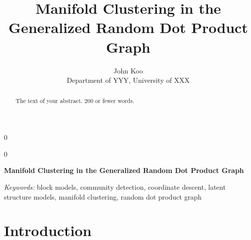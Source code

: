 \documentclass[12pt]{article}
\newcommand{\blind}{0}
\begin{document}
\def\spacingset#1{\renewcommand{\baselinestretch}%
{#1}\small\normalsize} \spacingset{1}



\blind
{
  \title{\bf Manifold Clustering in the Generalized Random Dot Product
Graph}

  \author{
        John Koo \\
    Department of YYY, University of XXX\\
      }
  \maketitle
} \fi

\blind
{
  \bigskip
  \bigskip
  \bigskip
  \begin{center}
    {\LARGE\bf Manifold Clustering in the Generalized Random Dot Product
Graph}
  \end{center}
  \medskip
} \fi

\bigskip
\begin{abstract}
The text of your abstract. 200 or fewer words.
\end{abstract}

\noindent%
{\it Keywords:} block models, community detection, coordinate descent,
latent structure models, manifold clustering, random dot product graph
\vfill

\newpage
\spacingset{1.45} %

\newcommand{\diag}{\mathrm{diag}}
\newcommand{\tr}{\mathrm{Tr}}
\newcommand{\blockdiag}{\mathrm{blockdiag}}
\newcommand{\indep}{\stackrel{\mathrm{ind}}{\sim}}
\newcommand{\iid}{\stackrel{\mathrm{iid}}{\sim}}
\newcommand{\Bernoulli}{\mathrm{Bernoulli}}
\newcommand{\Betadist}{\mathrm{Beta}}
\newcommand{\BG}{\mathrm{BernoulliGraph}}
\newcommand{\Uniform}{\mathrm{Uniform}}
\newcommand{\PABM}{\mathrm{PABM}}
\newcommand{\RDPG}{\mathrm{RDPG}}
\newcommand{\GRDPG}{\mathrm{GRDPG}}
\newcommand{\Multinomial}{\mathrm{Multinomial}}
\newtheorem{theorem}{Theorem}
\newtheorem{lemma}{Lemma}
\newtheorem{proposition}{Proposition}
\theoremstyle{remark}
\newtheorem{remark}{Remark}
\theoremstyle{definition}
\newtheorem{definition}{Definition}
\newtheorem{example}{Example}
\newcommand{\dd}{\mathrm{d}}
\newcommand{\as}{\stackrel{\mathrm{a.s.}}{\to}}
\newcommand{\ER}{\text{Erd\"{o}s-R\'{e}nyi}}

\hypertarget{introduction}{%
\section{Introduction}\label{introduction}}
\end{document}
